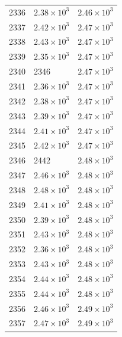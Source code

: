 \begin{table}[H]
\begin{tabular}{lll}
2336 & $\displaystyle 2.38 \times 10^{3}$ & $\displaystyle 2.46 \times 10^{3}$ \\
2337 & $\displaystyle 2.42 \times 10^{3}$ & $\displaystyle 2.47 \times 10^{3}$ \\
2338 & $\displaystyle 2.43 \times 10^{3}$ & $\displaystyle 2.47 \times 10^{3}$ \\
2339 & $\displaystyle 2.35 \times 10^{3}$ & $\displaystyle 2.47 \times 10^{3}$ \\
2340 & 2346 & $\displaystyle 2.47 \times 10^{3}$ \\
2341 & $\displaystyle 2.36 \times 10^{3}$ & $\displaystyle 2.47 \times 10^{3}$ \\
2342 & $\displaystyle 2.38 \times 10^{3}$ & $\displaystyle 2.47 \times 10^{3}$ \\
2343 & $\displaystyle 2.39 \times 10^{3}$ & $\displaystyle 2.47 \times 10^{3}$ \\
2344 & $\displaystyle 2.41 \times 10^{3}$ & $\displaystyle 2.47 \times 10^{3}$ \\
2345 & $\displaystyle 2.42 \times 10^{3}$ & $\displaystyle 2.47 \times 10^{3}$ \\
2346 & 2442 & $\displaystyle 2.48 \times 10^{3}$ \\
2347 & $\displaystyle 2.46 \times 10^{3}$ & $\displaystyle 2.48 \times 10^{3}$ \\
2348 & $\displaystyle 2.48 \times 10^{3}$ & $\displaystyle 2.48 \times 10^{3}$ \\
2349 & $\displaystyle 2.41 \times 10^{3}$ & $\displaystyle 2.48 \times 10^{3}$ \\
2350 & $\displaystyle 2.39 \times 10^{3}$ & $\displaystyle 2.48 \times 10^{3}$ \\
2351 & $\displaystyle 2.43 \times 10^{3}$ & $\displaystyle 2.48 \times 10^{3}$ \\
2352 & $\displaystyle 2.36 \times 10^{3}$ & $\displaystyle 2.48 \times 10^{3}$ \\
2353 & $\displaystyle 2.43 \times 10^{3}$ & $\displaystyle 2.48 \times 10^{3}$ \\
2354 & $\displaystyle 2.44 \times 10^{3}$ & $\displaystyle 2.48 \times 10^{3}$ \\
2355 & $\displaystyle 2.44 \times 10^{3}$ & $\displaystyle 2.48 \times 10^{3}$ \\
2356 & $\displaystyle 2.46 \times 10^{3}$ & $\displaystyle 2.49 \times 10^{3}$ \\
2357 & $\displaystyle 2.47 \times 10^{3}$ & $\displaystyle 2.49 \times 10^{3}$ \\

\end{tabular}
\end{table}
